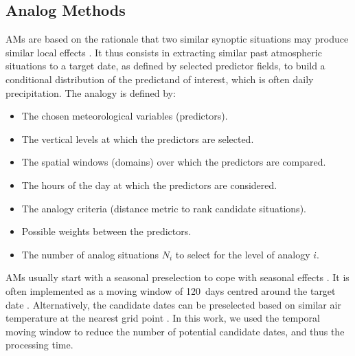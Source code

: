 \documentclass[draft]{agujournal2019}
\begin{document}
\subsection{Analog Methods}
\label{ams}

AMs are based on the rationale that two similar synoptic situations may produce similar local effects \cite{Lorenz1956, Lorenz1969}. It thus consists in extracting similar past atmospheric situations to a target date, as defined by selected predictor fields, to build a conditional distribution of the predictand of interest, which is often daily precipitation. The analogy is defined by:

\begin{itemize}		
	\item The chosen meteorological variables (predictors).
	\item The vertical levels at which the predictors are selected.
	\item The spatial windows (domains) over which the predictors are compared.
	\item The hours of the day at which the predictors are considered.
	\item The analogy criteria (distance metric to rank candidate situations).
	\item Possible weights between the predictors.
	\item The number of analog situations $N_{i}$ to select for the level of analogy $i$.
\end{itemize}

AMs usually start with a seasonal preselection to cope with seasonal effects \cite{Lorenz1969}. It is often implemented as a moving window of 120~days centred around the target date \cite{Bontron2004, Marty2012, Horton2012, BenDaoud2016}. Alternatively, the candidate dates can be preselected based on similar air temperature at the nearest grid point \cite[methods PT-2Z-4MI and PT-2Z-4W-4MI in Table \ref{table:methods}]{BenDaoud2016}. In this work, we used the temporal moving window to reduce the number of potential candidate dates, and thus the processing time.
\end{document}
